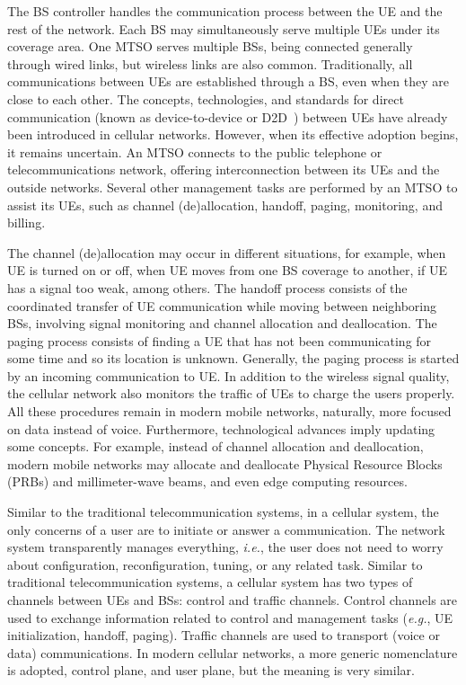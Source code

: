 The BS controller handles the communication process between the UE and the rest of the network. Each BS may simultaneously serve multiple UEs under its coverage area. One MTSO serves multiple BSs, being connected generally through wired links, but wireless links are also common. Traditionally, all communications between UEs are established through a BS, even when they are close to each other. The concepts, technologies, and standards for direct communication (known as device-to-device or D2D~\cite{kar:18}) between UEs have already been introduced in cellular networks. However, when its effective adoption begins, it remains uncertain. An MTSO connects to the public telephone or telecommunications network, offering interconnection between its UEs and the outside networks. Several other management tasks are performed by an MTSO to assist its UEs, such as channel (de)allocation, handoff, paging, monitoring, and billing.

The channel (de)allocation may occur in different situations, for example, when UE is turned on or off, when UE moves from one BS coverage to another, if UE has a signal too weak, among others. The handoff process consists of the coordinated transfer of UE communication while moving between neighboring BSs, involving signal monitoring and channel allocation and deallocation. The paging process consists of finding a UE that has not been communicating for some time and so its location is unknown. Generally, the paging process is started by an incoming communication to UE. In addition to the wireless signal quality, the cellular network also monitors the traffic of UEs to charge the users properly. All these procedures remain in modern mobile networks, naturally, more focused on data instead of voice. Furthermore, technological advances imply updating some concepts. For example, instead of channel allocation and deallocation, modern mobile networks may allocate and deallocate Physical Resource Blocks (PRBs) and millimeter-wave beams, and even edge computing resources.

Similar to the traditional telecommunication systems, in a cellular system, the only concerns of a user are to initiate or answer a communication. The network system transparently manages everything, \textit{i.e.}, the user does not need to worry about configuration, reconfiguration, tuning, or any related task. Similar to traditional telecommunication systems, a cellular system has two types of channels between UEs and BSs: control and traffic channels. Control channels are used to exchange information related to control and management tasks (\textit{e.g.}, UE initialization, handoff, paging). Traffic channels are used to transport (voice or data) communications. In modern cellular networks, a more generic nomenclature is adopted, control plane, and user plane, but the meaning is very similar.

